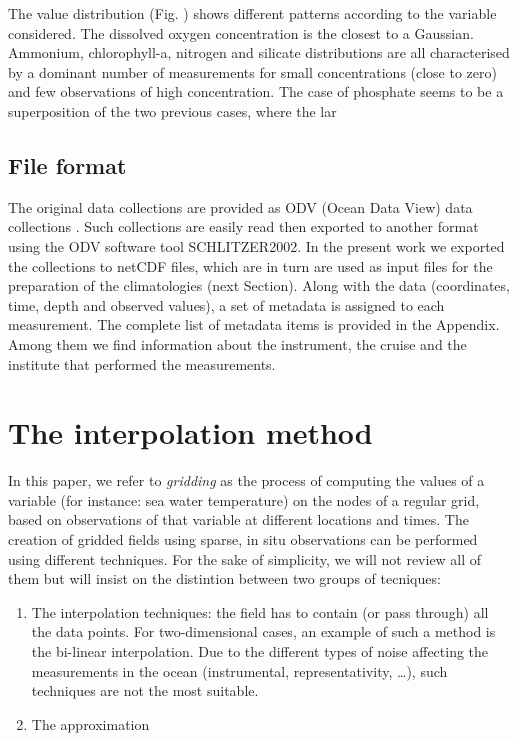 \documentclass[essd, manuscript]{copernicus}
\begin{document}
The value distribution (Fig. ) shows different patterns according to the variable considered. The dissolved oxygen concentration is the closest to a Gaussian. Ammonium, chlorophyll-a, nitrogen and silicate distributions are all characterised by a dominant number of measurements for small concentrations (close to zero) and few observations of high concentration. The case of phosphate seems to be a superposition of the two previous cases, where the lar


\subsection{File format}
The original data collections are provided as ODV (Ocean Data View) data collections \citep{Lowry2023}. Such collections are easily read then exported to another format using the ODV software tool {SCHLITZER2002}. In the present work we exported the collections to netCDF files, which are in turn are used as input files for the preparation of the climatologies (next Section). 
Along with the data (coordinates, time, depth and observed values), a set of metadata is assigned to each measurement. The complete list of metadata items is provided in the Appendix. Among them we find information about the instrument, the cruise and the institute that performed the measurements. 

\section{The interpolation method}

In this paper, we refer to \textit{gridding} as the process of computing the values of a variable (for instance: sea water temperature) on the nodes of a regular grid, based on observations of that variable at different locations and times.
The creation of gridded fields using sparse, in situ observations can be performed using different techniques. For the sake of simplicity, we will not review all of them but will insist on the distintion between two groups of tecniques:
\begin{enumerate}
\item The interpolation techniques: the field has to contain (or pass through) all the data points. For two-dimensional cases, an example of such a method is the bi-linear interpolation. Due to the different types of noise affecting the measurements in the ocean (instrumental, representativity, \ldots), such techniques are not the most suitable.
\item The approximation 
\end{enumerate}
\end{document}
